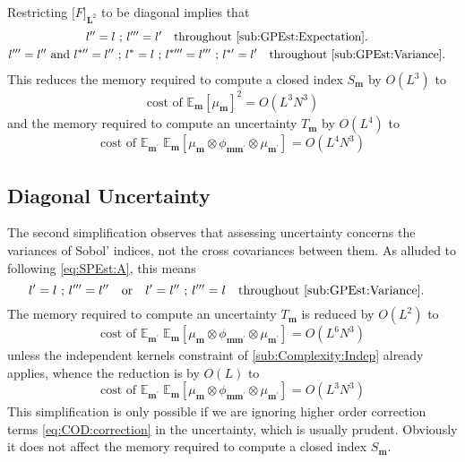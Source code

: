 \documentclass[preprint,12pt]{elsarticle}
\newcommand*{\M}[1]{\ensuremath{#1}\xspace}
\newcommand*{\mi}[1]{\mathbf{#1}}
\newcommand*{\te}[2][]{\left\lbrack{#2}\right\rbrack_{#1}}
\newcommand*{\tte}[2][]{\lbrack{#2}\rbrack_{#1}}
\newcommand{\T}[1]{\text{#1}}
\newcommand*{\QT}[2][]{\M{\quad\T{#2}\ifthenelse{\equal{#1}{}}{\quad}{#1}}}
\newcommand*{\evt}[3][]{\mathbb{E}_{#3}^{#1}\!#2}
\begin{document}
    Restricting $\tte[\mi{L}^{2}]{F}$ to be diagonal implies that
    \begin{gather*}
        l^{\prime\prime} = l \T{ ; } l^{\prime\prime\prime} = l^{\prime} \QT{throughout \cref{sub:GPEst:Expectation}.}  \\ 
        l^{\prime\prime\prime} = l^{\prime\prime} \T{ and } l^{*\prime\prime} = l^{\prime\prime} \T{ ; } l^{*} = l \T{ ; } l^{*\prime\prime\prime} = l^{\prime\prime\prime} \T{ ; } l^{*\prime} = l^{\prime} \QT{throughout \cref{sub:GPEst:Variance}.}
    \end{gather*}
    This reduces the memory required to compute a closed index $S_{\mi{m}}$ by $O(L^3)$ to
    \begin{equation*}
        \T{cost of }\evt{\te[]{\mu_{\mi{m}}}^{2}}{\mi{m}} = O(L^{3}N^{3})
    \end{equation*}
    and the memory required to compute an uncertainty $T_{\mi{m}}$ by $O(L^4)$ to
    \begin{equation*}
        \T{cost of }\evt{\;\evt{\te[]{\mu_{\mi{m}} \otimes \phi_{\mi{mm^{\prime}}} \otimes \mu_{\mi{m^{\prime}}}}}}{\mi{m^{\prime}}}{\mi{m}} = O(L^{4}N^{3})
    \end{equation*}

    \subsection{Diagonal Uncertainty}\label{sub:Complexity:Diag}
    The second simplification observes that assessing uncertainty concerns the variances of Sobol' indices, not the cross covariances between them. 
    As alluded to following \cref{eq:SPEst:A}, this means
    \begin{equation*}
        l^{\prime} = l \T{ ; } l^{\prime\prime\prime} = l^{\prime\prime} \QT{or} 
        l^{\prime} = l^{\prime\prime} \T{ ; } l^{\prime\prime\prime} = l \QT{throughout \cref{sub:GPEst:Variance}.}   
    \end{equation*}
    The memory required to compute an uncertainty $T_{\mi{m}}$ is reduced by $O(L^2)$ to
    \begin{equation*}
        \T{cost of }\evt{\;\evt{\te[]{\mu_{\mi{m}} \otimes \phi_{\mi{mm^{\prime}}} \otimes \mu_{\mi{m^{\prime}}}}}}{\mi{m^{\prime}}}{\mi{m}} = O(L^{6}N^{3})
    \end{equation*}
    unless the independent kernels constraint of \cref{sub:Complexity:Indep} already applies, whence the reduction is by $O(L)$ to
    \begin{equation*}
        \T{cost of }\evt{\;\evt{\te[]{\mu_{\mi{m}} \otimes \phi_{\mi{mm^{\prime}}} \otimes \mu_{\mi{m^{\prime}}}}}}{\mi{m^{\prime}}}{\mi{m}} = O(L^{3}N^{3})
    \end{equation*}
    This simplification is only possible if we are ignoring higher order correction terms \cref{eq:COD:correction} in the uncertainty, which is usually prudent.
    Obviously it does not affect the memory required to compute a closed index $S_{\mi{m}}$.
\end{document}
